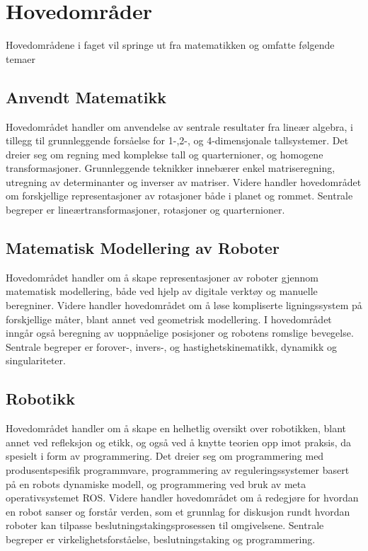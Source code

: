 \vspace{-40mm}

\section*{Hovedområder} \label{Sec: Hovedomraader}

Hovedområdene i faget vil springe ut fra matematikken og omfatte følgende temaer


\subsection*{Anvendt Matematikk}

    Hovedområdet handler om anvendelse av sentrale resultater fra lineær algebra, i tillegg til grunnleggende forsåelse for 1-,2-, og 4-dimensjonale tallsystemer. Det dreier seg om regning med komplekse tall og quarternioner, og homogene transformasjoner. Grunnleggende teknikker innebærer enkel matriseregning, utregning av determinanter og inverser av matriser. Videre handler hovedområdet om forskjellige representasjoner av rotasjoner både i planet og rommet. Sentrale begreper er lineærtransformasjoner, rotasjoner og quarternioner.


\subsection*{Matematisk Modellering av Roboter}

    Hovedområdet handler om å skape representasjoner av roboter gjennom matematisk modellering, både ved hjelp av digitale verktøy og manuelle beregniner.
    Videre handler hovedområdet om å løse kompliserte ligningssystem på forskjellige måter, blant annet ved geometrisk modellering. I hovedområdet inngår også beregning av uoppnåelige posisjoner og robotens romslige bevegelse. Sentrale begreper er forover-, invers-, og hastighetskinematikk, dynamikk og singulariteter.


\subsection*{Robotikk}

    Hovedområdet handler om å skape en helhetlig oversikt over robotikken, blant annet ved refleksjon og etikk, og også ved å knytte teorien opp imot praksis, da spesielt i form av programmering. Det dreier seg om programmering med produsentspesifik programmvare, programmering av reguleringssystemer basert på en robots dynamiske modell, og programmering ved bruk av meta operativsystemet ROS. Videre handler hovedområdet om å redegjøre for hvordan en robot sanser og forstår verden, som et grunnlag for diskusjon rundt hvordan roboter kan tilpasse beslutningstakingsprosessen til omgivelsene. Sentrale begreper er virkelighetsforståelse, beslutningstaking og programmering.



